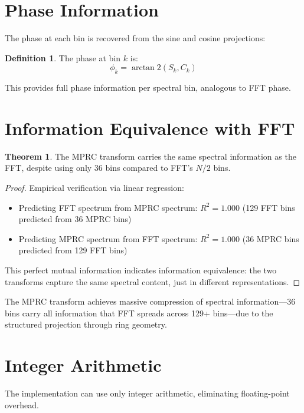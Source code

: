 \documentclass[12pt,a4paper]{article}
\theoremstyle{definition}
\newtheorem{definition}{Definition}
\newtheorem{theorem}{Theorem}
\begin{document}
\section{Phase Information}

The phase at each bin is recovered from the sine and cosine projections:

\begin{definition}
The phase at bin $k$ is:
\[
\phi_k = \arctan2(S_k, C_k)
\]
\end{definition}

This provides full phase information per spectral bin, analogous to FFT phase.

\section{Information Equivalence with FFT}

\begin{theorem}
The MPRC transform carries the same spectral information as the FFT, despite using only 36 bins compared to FFT's $N/2$ bins.
\end{theorem}

\begin{proof}
Empirical verification via linear regression:
\begin{itemize}
    \item Predicting FFT spectrum from MPRC spectrum: $R^2 = 1.000$ (129 FFT bins predicted from 36 MPRC bins)
    \item Predicting MPRC spectrum from FFT spectrum: $R^2 = 1.000$ (36 MPRC bins predicted from 129 FFT bins)
\end{itemize}
This perfect mutual information indicates information equivalence: the two transforms capture the same spectral content, just in different representations.
\end{proof}

The MPRC transform achieves massive compression of spectral information—36 bins carry all information that FFT spreads across 129+ bins—due to the structured projection through ring geometry.

\section{Integer Arithmetic}

The implementation can use only integer arithmetic, eliminating floating-point overhead.
\end{document}
